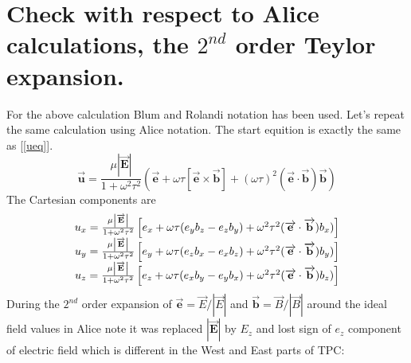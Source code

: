 \documentclass[12pt]{article} %
\begin{document}
\section{Check with respect to Alice calculations, the $2^{nd}$ order Teylor expansion.}
\par
For the above calculation Blum and Rolandi notation \cite{Blum} has been used.
Let's repeat the same calculation using Alice notation\cite{Rossegger}.
The start equition is exactly the same as [\ref{ueq}]. 
\begin{equation*} 
 \overrightarrow{\mathbf{u}}=
\frac{\mu \left| \overrightarrow{\mathbf{E}} \right|}{1 + \omega^2\tau^2} 
\left(
 \overrightarrow{\mathbf{e}} + 
 \omega \tau    [ \overrightarrow{\mathbf{e}} \times \overrightarrow{\mathbf{b}}] + 
(\omega \tau)^2 ( \overrightarrow{\mathbf{e}} \cdot  \overrightarrow{\mathbf{b}}) \overrightarrow{\mathbf{b}} 
\right)
\end{equation*}
The Cartesian components are 
\begin{equation*} 
\begin{matrix}
u_{x} = 
\frac{\mu \left| \overrightarrow{\mathbf{E}} \right|}{1 + \omega^2\tau^2} 
\left[
e_{x} + \omega \tau (e_{y} b_{z} - e_{z} b_{y}) + \omega^2 \tau^2 ( \overrightarrow{\mathbf{e}} \cdot  \overrightarrow{\mathbf{b}}) b_{x})
\right] \cr
u_{y} = 
\frac{\mu \left| \overrightarrow{\mathbf{E}} \right|}{1 + \omega^2\tau^2} 
\left[
e_{y} + \omega \tau (e_{z} b_{x} - e_{x} b_{z}) + \omega^2 \tau^2 ( \overrightarrow{\mathbf{e}} \cdot  \overrightarrow{\mathbf{b}}) b_{y})
\right] \cr
u_{z} = 
\frac{\mu \left| \overrightarrow{\mathbf{E}} \right|}{1 + \omega^2\tau^2} 
\left[
e_{z} + \omega \tau (e_{x} b_{y} - e_{y} b_{x}) + \omega^2 \tau^2 ( \overrightarrow{\mathbf{e}} \cdot  \overrightarrow{\mathbf{b}}) b_{z})
\right] \cr
\end{matrix}
\end{equation*}
During the $2^{nd}$ order expansion of 
$\overrightarrow{\mathbf{e}} = \overrightarrow{E} / \left|\overrightarrow{E} \right| $ and  
$\overrightarrow{\mathbf{b}} = \overrightarrow{B} / \left|\overrightarrow{B} \right| $ around the ideal field values in Alice note\cite{Rossegger}
it was replaced $\mathbf{ \left|\overrightarrow{E} \right| }$ by $E_{z}$ and
lost sign of $e_{z}$ component of electric field which is different in the West and East parts of TPC:
\end{document}
